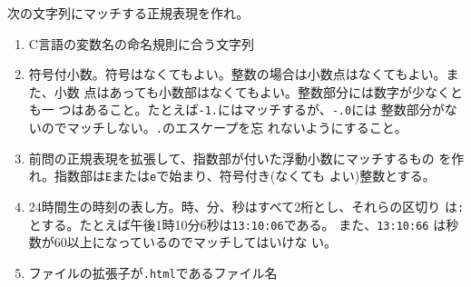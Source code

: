 \begin{Prob}\upshape
次の文字列にマッチする正規表現を作れ。
\begin{enumerate}
 \item C言語の変数名の命名規則に合う文字列\ifText\\[0.05\textheight]\fi
 \item 符号付小数。符号はなくてもよい。整数の場合は小数点はなくてもよい。また、小数
       点はあっても小数部はなくてもよい。整数部分には数字が少なくとも一
       つはあること。たとえば\Verb+-1.+にはマッチするが、\Verb+-.0+には
       整数部分がないのでマッチしない。\Verb+.+のエスケープを忘
       れないようにすること。\ifText\\[0.05\textheight]\fi
 \item 前問の正規表現を拡張して、指数部が付いた浮動小数にマッチするもの
       を作れ。指数部は\Verb+E+または\Verb+e+で始まり、符号付き(なくても
       よい)整数とする。\ifText\\[0.05\textheight]\fi
 \item 24時間生の時刻の表し方。時、分、秒はすべて2桁とし、それらの区切り
       は\Verb+:+とする。たとえば午後1時10分6秒は\Verb+13:10:06+である。
  また、\Verb+13:10:66+ は秒数が60以上になっているのでマッチしてはいけな
       い。
       \ifText\\[0.05\textheight]\fi
 \item ファイルの拡張子が\texttt{.html}であるファイル名\ifText\\[0.05\textheight]\fi
\end{enumerate}
\end{Prob}

